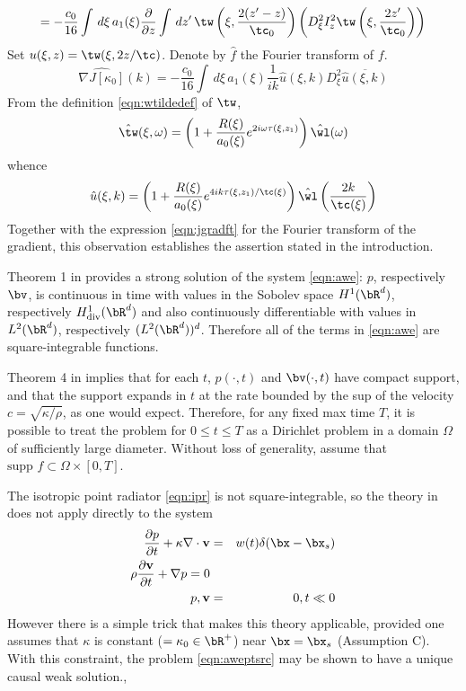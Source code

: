 \begin{equation}
\label{eqn:jgrad}
=-\frac{c_0}{16} \int \,d\xi\,a_1(\xi)\frac{\partial}{\partial z} \int \,dz'\, 
  \tw\left(\xi,\frac{2(z'-z)}{\tc_0}\right)\left(D_{\xi}^2I_z^2
    \tw\left(\xi,\frac{2z'}{\tc_0}\right)\right)
\end{equation} 
Set $u(\xi,z) = \tw(\xi,2z/\tc)$. Denote by $\hat{f}$ the Fourier
transform of $f$.  
\begin{equation}
\label{eqn:jgradft}
\widehat{\nabla J[\kappa_0]}(k) = -\frac{c_0}{16}\int\, d\xi\,a_1(\xi) 
\frac{1}{ik}\hat{u}(\xi,k)D_{\xi}^2\overline{\hat{u}(\xi,k)}
\end{equation}
From the definition \ref{eqn:wtildedef} of $\tw$,
\[
\hat{\tw}(\xi,\omega) = \left(1 + \frac{R(\xi)}{a_0(\xi)}e^{2i\omega\tau(\xi,z_1)}\right)\hat{\wl}(\omega)
\]
whence
\[
\hat{u}(\xi,k) = \left(1 +
  \frac{R(\xi)}{a_0(\xi)}e^{4ik\tau(\xi,z_1)/\tc(\xi)}\right)\hat{\wl}\left(\frac{2k}{\tc(\xi)}\right) 
\]
Together with the expression \ref{eqn:jgradft} for the Fourier
transform of the gradient, this observation establishes the assertion
stated in the introduction.

Theorem 1 in \cite[]{BlazekStolkSymes:13} provides a strong solution of the system \ref{eqn:awe}: $p$, respectively $\bv$, is continuous
in time with values in the Sobolev space $H^1(\bR^d)$, respectively
$H^1_{\rm div}(\bR^d)$ and
also continuously differentiable with values in $L^2(\bR^d)$,
respectively $(L^2(\bR^d))^d$. Therefore all of the terms in
\ref{eqn:awe} are square-integrable functions.

Theorem 4 in \cite[]{BlazekStolkSymes:13} implies that for each $t$, $p(\cdot,t)$ and $\bv(\cdot,t)$
have compact support, and that the support expands in $t$ at the rate
bounded by the sup of the velocity $c=\sqrt{\kappa/\rho}$, as one
would expect. Therefore, for any fixed max time $T$, it is possible to
treat the problem for $0\le t \le T$ as a Dirichlet problem in a
domain $\Omega$ of sufficiently large diameter. Without loss of
generality, assume that $\mbox{supp }f \subset \Omega \times [0,T]$.

The isotropic point radiator \ref{eqn:ipr} is not
square-integrable, so the theory in \cite[]{BlazekStolkSymes:13} does
not apply directly to the system
\begin{eqnarray}
\label{eqn:aweptsrc}
\frac{\partial p}{\partial t} + \kappa \nabla \cdot {\bf v} &=&
                                                                w(t)\delta(\bx-\bx_s) \nonumber\\
\rho \frac{\partial {\bf v}}{\partial t} + \nabla p = 0 \nonumber\\
p,{\bf v}&=&0, t \ll 0
\end{eqnarray}
However there is a simple trick that makes this
theory applicable, provided one assumes that $\kappa$ is constant
($=\kappa_0 \in \bR^+$) near
$\bx=\bx_s$ (Assumption C). With this constraint, the problem
\ref{eqn:aweptsrc} may be shown to have a unique causal weak solution.,

